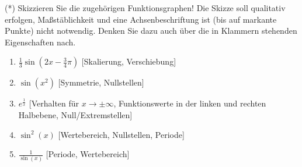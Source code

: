 \item (*) Skizzieren Sie die zugehörigen Funktionsgraphen! Die Skizze soll qualitativ erfolgen, Maßstäblichkeit und eine Achsenbeschriftung ist (bis auf markante Punkte) nicht notwendig. Denken Sie dazu auch über die in Klammern stehenden Eigenschaften nach.
\begin{enumerate}
\item $\frac{1}{3}\sin(2x-\frac{3}{4}\pi)$ {\footnotesize[Skalierung, Verschiebung]}
\item $\sin(x^2)$ {\footnotesize[Symmetrie, Nullstellen]}
\item $e^\frac{1}{x}$ {\footnotesize[Verhalten für $x\to\pm\infty$, Funktionswerte in der linken und rechten Halbebene, Null/Extremstellen]}
\item $\sin^2(x)$ {\footnotesize[Wertebereich, Nullstellen, Periode]}
\item $\frac{1}{\sin(x)}$ {\footnotesize[Periode, Wertebereich]}
\end{enumerate}

